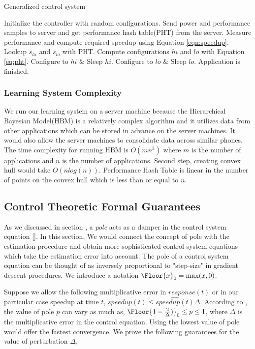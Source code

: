 \begin{algorithm}
\caption{Generalized control system}
\begin{algorithmic}
\REQUIRE Initialize the controller with random configurations. Send power and performance samples to server and get performance hash table(PHT) from the server.
    \STATE    Measure performance and compute required speedup using Equation \eqref{eqn:speedup}.
    \STATE    Lookup $s_{hi}$ and $s_{lo}$ with PHT.
    \STATE    Compute configurations $hi$ and $lo$ with Equation \eqref{eq:pht}.
    \STATE    Configure to $hi$ $\&$ Sleep $hi$.
    \STATE    Configure to $lo$ $\&$ Sleep $lo$.
\ENDWHILE
\STATE Application is finished.
\end{algorithmic}
\end{algorithm}
\subsubsection{Learning System Complexity}
We run our learning system on a server machine because the Hierarchical Bayesian Model(HBM) is a relatively complex algorithm and it utilizes data from other applications which can be stored in advance on the server machines. It would also allow the server machines to consolidate data across similar phones. The time complexity for running HBM is $O(mn^3)$ where $m$ is the number of applications and $n$ is the number of applications. Second step, creating convex hull would take $O(n log(n))$. Performance Hash Table is linear in the number of points on the convex hull which is less than  or equal to $n$. 

\subsection{Control Theoretic Formal Guarantees}
As we discussed in section \secref{}, a \emph{pole} acts as a damper in the
control system equation \eqref{}. In this section, We would connect the concept
of pole with the estimation procedure and obtain more sophisticated control
system equations which take the estimation error into account.
The pole of a control system equation can be thought of as inversely proportional
to "step-size" in gradient descent procedures. %
We introduce a notation $\Floor{x}_0 = \max(x,0)$.

Suppose we allow the following multiplicative error in $response(t)$ or in our
particular case speedup at time $t$, $speedup(t) \leq  \hat{speedup(t)} \Delta$.
According to \cite{}, the value of pole $p$ can vary as much as,
$\Floor{1-\frac{2}{\Delta})}_0\leq p \leq 1$, where $\Delta$ is the multiplicative
error in the control equation. Using the lowest value of pole would offer the
fastest convergence. We prove the following guarantees for the value of perturbation $\Delta$,

